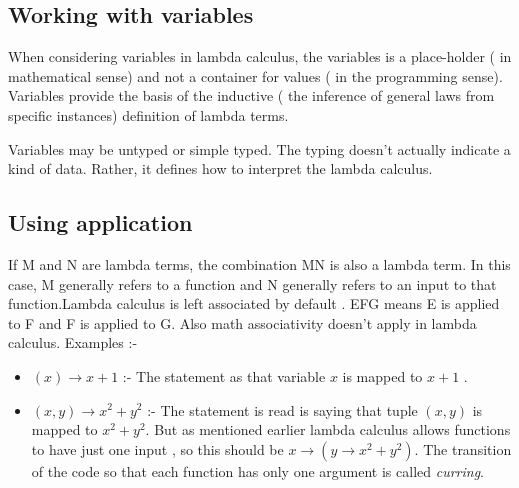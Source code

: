 \subsection{Working with variables}
When considering variables in lambda calculus, the variables is a place-holder ( in mathematical sense) and not a container for values ( in the programming sense). Variables provide the basis of the inductive ( the inference of general laws from specific instances) definition of lambda terms. 

Variables may be untyped or simple typed. The typing doesn't actually indicate a kind of data. Rather, it defines how to interpret the lambda calculus.
\subsection{Using application}
If M and N are lambda terms, the combination MN is also a lambda term. In this case, M generally refers to a function and N generally refers to an input to that function.Lambda calculus is left associated by default . EFG means E is applied to F and F is applied to G. Also math associativity doesn't apply in lambda calculus. Examples :-
\begin{itemize}
\item  $(x)  \rightarrow  x + 1 $ :- The statement as that variable $x$ is mapped to $ x + 1$ .
\item $(x,y) \rightarrow x^2 + y^2 $ :- The statement is read is saying that tuple $(x,y) $ is mapped to $x^2 + y^2$. But as mentioned earlier lambda calculus allows functions to have just one input , so this should be  $x \rightarrow (y \rightarrow x^2 + y^2 )$. The transition of the code so that each function has only one argument  is called \emph{curring}.
\end{itemize}
